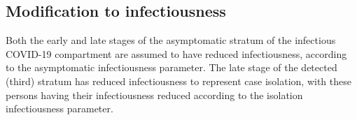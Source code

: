 \subsection{Modification to infectiousness}
Both the early and late stages of the asymptomatic stratum 
of the infectious COVID-19 compartment are assumed to have reduced infectiousness,
according to the asymptomatic infectiousness parameter.
The late stage of the detected (third) stratum has reduced infectiousness 
to represent case isolation,
with these persons having their infectiousness reduced 
according to the isolation infectiousness parameter.

